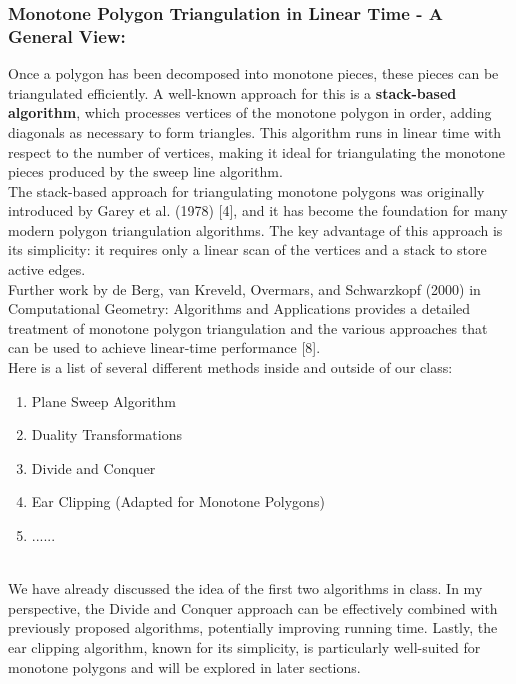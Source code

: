 \documentclass{article}
\begin{document}
\subsubsection*{Monotone Polygon Triangulation in Linear Time - A General View: }
Once a polygon has been decomposed into monotone pieces, these pieces can be triangulated efficiently. A well-known approach for this is a \textbf{stack-based algorithm}, which processes vertices of the monotone polygon in order, adding diagonals as necessary to form triangles. This algorithm runs in linear time with respect to the number of vertices, making it ideal for triangulating the monotone pieces produced by the sweep line algorithm.
\\
The stack-based approach for triangulating monotone polygons was originally introduced by Garey et al. (1978) [4], and it has become the foundation for many modern polygon triangulation algorithms. The key advantage of this approach is its simplicity: it requires only a linear scan of the vertices and a stack to store active edges.
\\
Further work by de Berg, van Kreveld, Overmars, and Schwarzkopf (2000) in Computational Geometry: Algorithms and Applications provides a detailed treatment of monotone polygon triangulation and the various approaches that can be used to achieve linear-time performance [8].
\\
Here is a list of several different methods inside and outside of our class:
\begin{enumerate}
    \item Plane Sweep Algorithm
    \item Duality Transformations
    \item Divide and Conquer
    \item Ear Clipping (Adapted for Monotone Polygons)
    \item ......
\end{enumerate}
\\
We have already discussed the idea of the first two algorithms in class. In my perspective, the Divide and Conquer approach can be effectively combined with previously proposed algorithms, potentially improving running time. Lastly, the ear clipping algorithm, known for its simplicity, is particularly well-suited for monotone polygons and will be explored in later sections.
\end{document}
